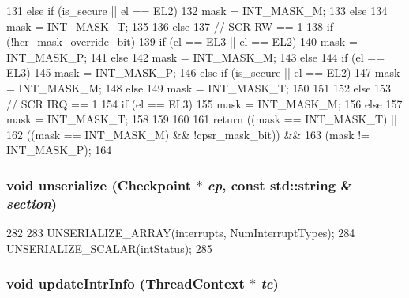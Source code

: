 \begin{DoxyCode}
{{{{{131                     else if (is_secure || el == EL2)
132                         mask = INT_MASK_M;
133                     else
134                         mask = INT_MASK_T;
135                 }
136             } else {
137                 // SCR RW == 1
138                 if (!hcr_mask_override_bit) {
139                     if (el == EL3 || el == EL2)
140                         mask = INT_MASK_P;
141                     else
142                         mask = INT_MASK_M;
143                 } else {
144                     if (el == EL3)
145                         mask = INT_MASK_P;
146                     else if (is_secure || el == EL2)
147                         mask = INT_MASK_M;
148                     else
149                         mask = INT_MASK_T;
150                 }
151             }
152         } else {
153             // SCR IRQ == 1
154             if (el == EL3)
155                 mask = INT_MASK_M;
156             else
157                 mask = INT_MASK_T;
158         }
159     }
160 
161     return ((mask == INT_MASK_T) ||
162             ((mask == INT_MASK_M) && !cpsr_mask_bit)) &&
163             (mask != INT_MASK_P);
164 }
\end{DoxyCode}
\hypertarget{classArmISA_1_1Interrupts_af22e5d6d660b97db37003ac61ac4ee49}{
\subsubsection[{unserialize}]{\setlength{\rightskip}{0pt plus 5cm}void unserialize ({\bf Checkpoint} $\ast$ {\em cp}, \/  const std::string \& {\em section})}}
\label{classArmISA_1_1Interrupts_af22e5d6d660b97db37003ac61ac4ee49}



\begin{DoxyCode}
282     {
283         UNSERIALIZE_ARRAY(interrupts, NumInterruptTypes);
284         UNSERIALIZE_SCALAR(intStatus);
285     }
\end{DoxyCode}
\hypertarget{classArmISA_1_1Interrupts_a00892e9b06edcba6c3c27454d6235100}{
\subsubsection[{updateIntrInfo}]{\setlength{\rightskip}{0pt plus 5cm}void updateIntrInfo ({\bf ThreadContext} $\ast$ {\em tc})}}
\label{classArmISA_1_1Interrupts_a00892e9b06edcba6c3c27454d6235100}



